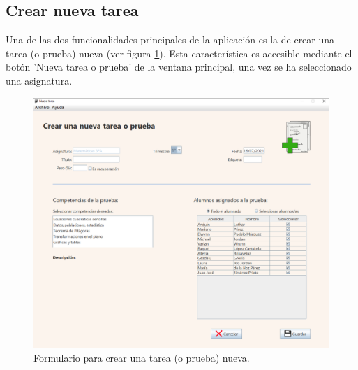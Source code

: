 \subsection{Crear nueva tarea}
Una de las dos funcionalidades principales de la aplicación es la de crear una tarea (o prueba) nueva (ver figura \ref{Fig:creartarea}). Esta característica es accesible mediante el botón 'Nueva tarea o prueba' de la ventana principal, una vez se ha seleccionado una asignatura.

\begin{figure}[h]
\centering\includegraphics[width=1\linewidth]{figs/creartarea.png}
\caption{Formulario para crear una tarea (o prueba) nueva.}
\label{Fig:creartarea}
\end{figure}

